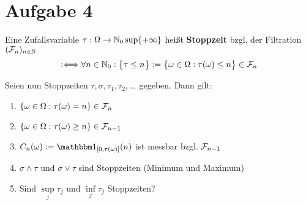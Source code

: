 \documentclass[12pt,a4paper]{article}
\begin{document}
\section*{Aufgabe 4}
\begin{defi}
Eine Zufallsvariable $\tau:\Omega\to\mathbb{N}_0\sup\lbrace+\infty\rbrace$ heißt \textbf{Stoppzeit} bzgl. der Filtration $(\mathcal{F}_n)_{n\in\mathbb{N}}$
\begin{align*}
:\Longleftrightarrow\forall n\in\mathbb{N}_0:\big\lbrace\tau\leq n\big\rbrace:=\big\lbrace \omega\in\Omega:\tau(\omega)\leq n\big\rbrace\in\mathcal{F}_n
\end{align*}
\end{defi}
Seien nun Stoppzeiten $\tau,\sigma,\tau_1,\tau_2,\ldots$ gegeben. Dann gilt:
\begin{enumerate}[label=\alph*)]
\item $\lbrace\omega\in\Omega:\tau(\omega)=n\rbrace\in\mathcal{F}_n$
\item $\lbrace\omega\in\Omega:\tau(\omega)\geq n\rbrace\in\mathcal{F}_{n-1}$
\item $\begin{aligned}
C_n(\omega):=\indi_{[0,\tau(\omega)]}(n)
\end{aligned}$ ist messbar bzgl. $\mathcal{F}_{n-1}$
\item $\sigma\wedge\tau$ und $\sigma\vee\tau$ sind Stoppzeiten (Minimum und Maximum)
\item Sind $\sup\limits_j\tau_j$ und $\inf\limits_j\tau_j$ Stoppzeiten?
\end{enumerate}
\end{document}
